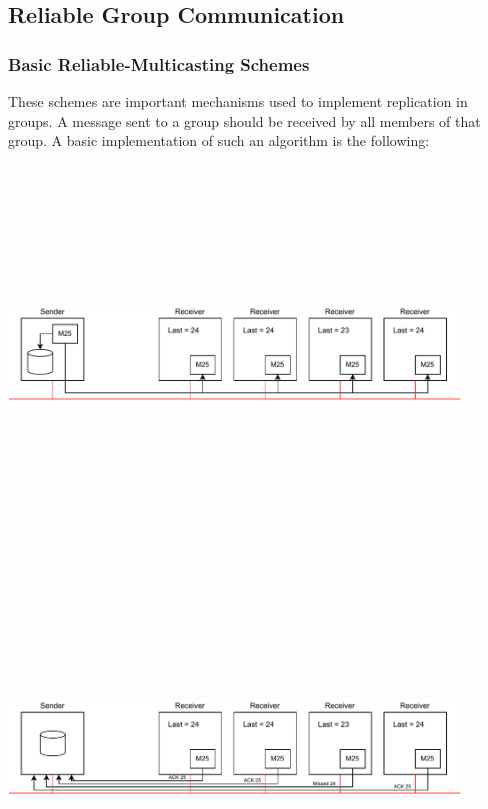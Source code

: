 \documentclass{article}
\begin{document}
\subsection{Reliable Group Communication}
\subsubsection{Basic Reliable-Multicasting Schemes}
These schemes are important mechanisms used to implement replication in groups. A message sent to a group should be received by all members of that group. A basic implementation of such an algorithm is the following:
\begin{center}
	\includegraphics[width=12cm, height=10cm, keepaspectratio]{assets/multicasting-1.pdf}
\end{center}
\begin{center}
	\includegraphics[width=12cm, height=10cm, keepaspectratio]{assets/multicasting-2.pdf}
\end{center}
\end{document}

